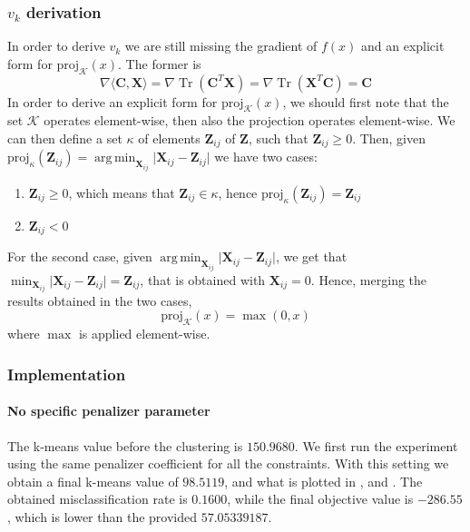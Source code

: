 \documentclass[12pt]{article}
\DeclareMathOperator*{\argmin}{arg\,min}
\DeclareMathOperator*{\tr}{Tr}
\newcommand{\boldZ}{\mathbf{Z}}
\newcommand{\boldX}{\mathbf{X}}
\newcommand{\boldC}{\mathbf{C}}
\newcommand*{\proj}{\text{proj}}
\begin{document}
\subsubsection{\texorpdfstring{$v_{k}$}{Lg} derivation}
In order to derive $v_k$ we are still missing the gradient of $f(x)$ and an explicit form for $\proj_{\mathcal{K}}(x)$. The former is
\begin{equation}
    \nabla \langle \boldC, \boldX \rangle = \nabla \tr(\boldC^T\boldX) = \nabla \tr(\boldX^T\boldC) = \boldC
\end{equation}
In order to derive an explicit form for $\proj_{\mathcal{K}}(x)$, we should first note that the set $\mathcal{K}$ operates element-wise, then also the projection operates element-wise. We can then define a set $\kappa$ of elements $\boldZ_{ij}$ of $\boldZ$, such that $\boldZ_{ij} \geq 0$. Then, given $\proj_{\kappa}(\boldZ_{ij}) = \argmin_{\boldX_{ij}} \lvert \boldX_{ij} - \boldZ_{ij} \rvert$ we have two cases:
\begin{enumerate}
    \item $\boldZ_{ij} \geq 0$, which means that $\boldZ_{ij} \in \kappa$, hence $\proj_{\kappa}(\boldZ_{ij}) = \boldZ_{ij}$
    \item $\boldZ_{ij} < 0$
\end{enumerate}
For the second case, given $\argmin_{\boldX_{ij}} \lvert \boldX_{ij} - \boldZ_{ij} \rvert$, we get that $\min_{\boldX_{ij}} \lvert \boldX_{ij} - \boldZ_{ij} \rvert = \boldZ_{ij}$, that is obtained with $\boldX_{ij} = 0$. Hence, merging the results obtained in the two cases,
\begin{equation}
    \proj_{\mathcal{K}}(x) = \max(0, x)
\end{equation}
where $\max$ is applied element-wise.

\subsubsection{Implementation}
\paragraph{No specific penalizer parameter}
The k-means value before the clustering is $150.9680$.
We first run the experiment using the same penalizer coefficient for all the constraints. With this setting we obtain a final k-means value of $98.5119$, and what is plotted in ,  and . The obtained misclassification rate is $0.1600$, while the final objective value is $-286.55$, which is lower than the provided $57.05339187$.
\end{document}
